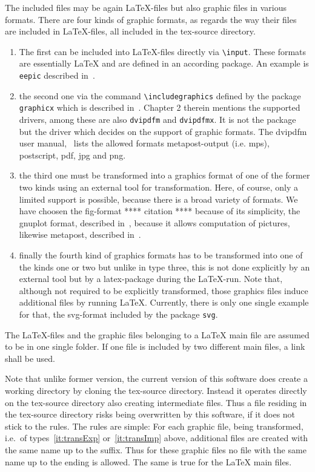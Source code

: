 \documentclass[12pt]{book}
\newcommand{\gls}[1]{#1}
\begin{document}
The included files may be again \LaTeX-files but also graphic files 
in various formats. 
There are four kinds of graphic formats, 
as regards the way their files are included in \LaTeX-files, 
all included in the tex-source directory. 
%
\begin{enumerate}
\item
The first can be included into \LaTeX-files directly 
via {\tt\textbackslash input}. 
These formats are essentially \LaTeX{} and are defined in an according package. 
An example is \texttt{eepic} described in~\cite{EEpic}. 
\item
the second one via the command {\tt\textbackslash includegraphics} 
defined by the package \texttt{graphicx} 
which is described in~\cite{GraX}. 
Chapter 2 therein mentions the supported drivers, 
among these are also \texttt{dvipdfm} and \texttt{dvipdfmx}. 
It is not the package but the driver 
which decides on the support of graphic formats. 
The dvipdfm user manual,~\cite{DviPdfMx} lists the allowed formats 
metapost-output (i.e. \gls{mps}), postscript, 
\gls{pdf}, \gls{jpg} and \gls{png}. 
\item\label{it:transExp}
the third one must be transformed into a graphics format 
of one of the former two kinds using an external tool for transformation. 
Here, of course, only a limited support is possible, 
because there is a broad variety of formats. 
We have choosen the \gls{fig}-format **** citation **** because of its simplicity, 
the gnuplot format, described in~\cite{GnuPlot}, 
because it allows computation of pictures, 
likewise metapost, described in~\cite{MPost}. 
\item\label{it:transImp}
finally the fourth kind of graphics formats 
has to be transformed into one of the kinds one or two 
but unlike in type three, this is not done explicitly 
by an external tool but by a latex-package during the \LaTeX-run. 
Note that, although not required to be explicitly transformed, 
those graphics files induce additional files 
by running \LaTeX. 
Currently, there is only one single example for that, 
the \gls{svg}-format included by the package \texttt{svg}. 
\end{enumerate}

The \LaTeX-files and the graphic files belonging to a \LaTeX{} main file 
are assumed to be in one single folder. 
If one file is included by two different main files, 
a link shall be used. 

Note that unlike former version, 
the current version of this software does create a working directory 
by cloning the tex-source directory. 
Instead it operates directly on the tex-source directory 
also creating intermediate files. 
Thus a file residing in the tex-source directory 
risks being overwritten by this software, 
if it does not stick to the rules. 
The rules are simple: 
For each graphic file, being transformed, 
i.e.~of types~\ref{it:transExp} or~\ref{it:transImp} above, 
additional files are created with the same name up to the suffix. 
Thus for these graphic files no file with the same name 
up to the ending is allowed. 
The same is true for the \LaTeX{} main files. 
\end{document}
